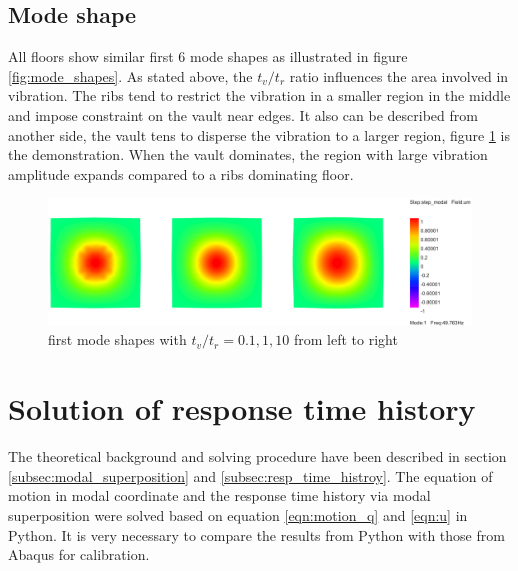 \subsection{Mode shape}
All floors show similar first 6 mode shapes as illustrated in figure \ref{fig:mode_shapes}. As stated above, the $t_v/t_r$ ratio influences the area involved in vibration. The ribs tend to restrict the vibration in a smaller region in the middle and impose constraint on the vault near edges. It also can be described from another side, the vault tens to disperse the vibration to a larger region, figure \ref{fig:first_modes} is the demonstration. When the vault dominates, the region with large vibration amplitude expands compared to a ribs dominating floor.
\begin{figure}[H]
\centering
\includegraphics[width=1\textwidth]{images/first_modes}
\caption{first mode shapes with $t_v/t_r=0.1,1,10$ from left to right}
\label{fig:first_modes}
\end{figure}

\section{Solution of response time history}
The theoretical background and solving procedure have been described in section \ref{subsec:modal_superposition} and \ref{subsec:resp_time_histroy}. The equation of motion in modal coordinate and the response time history via modal superposition were solved based on equation \ref{eqn:motion_q} and \ref{eqn:u} in Python. It is very necessary to compare the results from Python with those from Abaqus for calibration.
